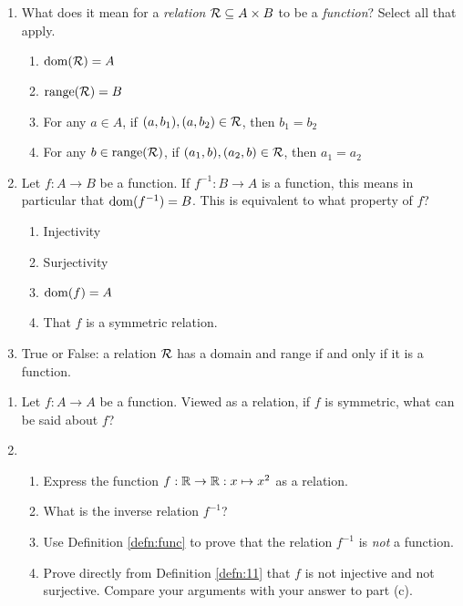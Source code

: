 \pagestyle{empty}


\begin{enumerate}
  \item What does it mean for a \emph{relation} $\mathcal{R}\subseteq A\times B$ to be a \emph{function}? Select all that apply.
  \begin{enumerate}
    \item $\operatorname{dom}(\mathcal{R})=A$
    \item $\operatorname{range}(\mathcal{R})=B$
    \item For any $a\in A$, if $(a,b_1),(a,b_2)\in\mathcal{R}$, then $b_1=b_2$
    \item For any $b\in\operatorname{range}(\mathcal{R})$, if $(a_1,b),(a_2,b)\in\mathcal{R}$, then $a_1=a_2$
  \end{enumerate}
    
  \item Let $f:A\to B$ be a function. If $f^{-1}:B\to A$ is a function, this means in particular that $\operatorname{dom}(f^{-1})=B$. This is equivalent to what property of $f$?
  \begin{enumerate}
		\item Injectivity
		\item Surjectivity
    \item $\operatorname{dom}(f)=A$
    \item That $f$ is a symmetric relation.
  \end{enumerate}
    
  \item True or False: a relation $\mathcal{R}$ has a domain and range if and only if it is a function.
\end{enumerate}



\begin{enumerate}
	\item Let $f:A\to A$ be a function. Viewed as a relation, if $f$ is symmetric, what can be said about $f$? 

	\item\begin{enumerate}
    \item Express the function $f:\mathbb{R}\to\mathbb{R}:x\mapsto x^2$ as a relation.
    \item What is the inverse relation $f^{-1}$?
    \item Use Definition \ref*{defn:func} to prove that the relation $f^{-1}$ is \emph{not} a function.
    \item Prove directly from Definition \ref*{defn:11} that $f$ is not injective and not surjective. Compare your arguments with your answer to part (c).
  \end{enumerate}
\end{enumerate}

